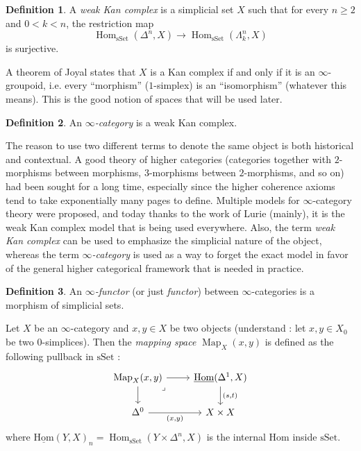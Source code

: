 \documentclass[11pt]{article}
\theoremstyle{definition}
\newtheorem{definition}{Definition}
\newcommand{\Hom}{\operatorname{Hom}}
\newcommand{\iHom}{\operatorname{\underline{Hom}}}
\newcommand{\Map}{\operatorname{Map}}
\newcommand{\sSet}{\mathrm{sSet}}
\begin{document}
\begin{definition}
    A \emph{weak Kan complex} is a simplicial set $X$ such that for every $n \geq 2$ and $0 < k < n$, the restriction map
    \[
        \Hom_{\sSet}(\Delta^n, X) \to \Hom_{\sSet}(\Lambda_k^n, X)
    \]
    is surjective.
\end{definition}

A theorem of Joyal states that $X$ is a Kan complex if and only if it is an $\infty$-groupoid, i.e. every \enquote{morphism} ($1$-simplex) is an \enquote{isomorphism} (whatever this means).
This is the good notion of spaces that will be used later.

\begin{definition}
    An \emph{$\infty$-category} is a weak Kan complex.
\end{definition}

The reason to use two different terms to denote the same object is both historical and contextual.
A good theory of higher categories (categories together with $2$-morphisms between morphisms, $3$-morphisms between $2$-morphisms, and so on) had been sought for a long time, especially since the higher coherence axioms tend to take exponentially many pages to define.
Multiple models for $\infty$-category theory were proposed, and today thanks to the work of Lurie (mainly), it is the weak Kan complex model that is being used everywhere.
Also, the term \emph{weak Kan complex} can be used to emphasize the simplicial nature of the object, whereas the term \emph{$\infty$-category} is used as a way to forget the exact model in favor of the general higher categorical framework that is needed in practice.

\begin{definition}
    An \emph{$\infty$-functor} (or just \emph{functor}) between $\infty$-categories is a morphism of simplicial sets.
\end{definition}

Let $X$ be an $\infty$-category and $x, y \in X$ be two objects (understand : let $x, y \in X_0$ be two $0$-simplices).
Then the \emph{mapping space} $\Map_X(x, y)$ is defined as the following pullback in $\sSet$ :
\[\begin{tikzcd}
	{\Map_X(x, y)} & {\iHom(\Delta^1, X)} \\
	{\Delta^0} & {X\times X}
	\arrow[from=1-1, to=1-2]
	\arrow[from=1-1, to=2-1]
	\arrow["\lrcorner"{anchor=center, pos=0.125}, draw=none, from=1-1, to=2-2]
	\arrow["{(s, t)}", from=1-2, to=2-2]
	\arrow["{(x, y)}"', from=2-1, to=2-2]
\end{tikzcd}\]
where $\iHom(Y, X)_n = \Hom_{\sSet}(Y \times \Delta^n, X)$ is the internal Hom inside $\sSet$.
\end{document}
